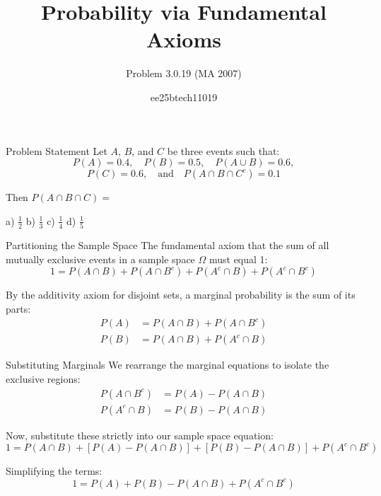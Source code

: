 \documentclass{beamer}
\title{Probability via Fundamental Axioms}
\subtitle{Problem 3.0.19 (MA 2007)}
\author{ee25btech11019}
\date{}
\begin{document}
\begin{frame}
    \titlepage
\end{frame}

\begin{frame}{Problem Statement}
    Let $A$, $B$, and $C$ be three events such that:
    \begin{equation*}
        P(A) = 0.4, \quad P(B) = 0.5, \quad P(A \cup B) = 0.6,
    \end{equation*}
    \begin{equation*}
        P(C) = 0.6, \quad \text{and} \quad P(A \cap B \cap C^c) = 0.1
    \end{equation*}
    
    Then $P(A \cap B \cap C) =$
    
    \vspace{0.5cm}
    a) $\frac{1}{2}$ \hspace{1cm} b) $\frac{1}{3}$ \hspace{1cm} c) $\frac{1}{4}$ \hspace{1cm} d) $\frac{1}{5}$
\end{frame}

\begin{frame}{Partitioning the Sample Space}
    The fundamental axiom that the sum of all mutually exclusive events in a sample space $\Omega$ must equal 1:
    \begin{equation}
        1 = P(A \cap B) + P(A \cap B^c) + P(A^c \cap B) + P(A^c \cap B^c)
    \end{equation}
    
    By the additivity axiom for disjoint sets, a marginal probability is the sum of its parts:
    \begin{align}
        P(A) &= P(A \cap B) + P(A \cap B^c) \\
        P(B) &= P(A \cap B) + P(A^c \cap B)
    \end{align}
\end{frame}

\begin{frame}{Substituting Marginals}
    We rearrange the marginal equations to isolate the exclusive regions:
    \begin{align}
        P(A \cap B^c) &= P(A) - P(A \cap B) \\
        P(A^c \cap B) &= P(B) - P(A \cap B)
    \end{align}
    
    Now, substitute these strictly into our sample space equation:
    \begin{equation*}
        1 = P(A \cap B) + [P(A) - P(A \cap B)] + [P(B) - P(A \cap B)] + P(A^c \cap B^c)
    \end{equation*}
    
    Simplifying the terms:
    \begin{equation}
        1 = P(A) + P(B) - P(A \cap B) + P(A^c \cap B^c)
    \end{equation}
\end{frame}
\end{document}
